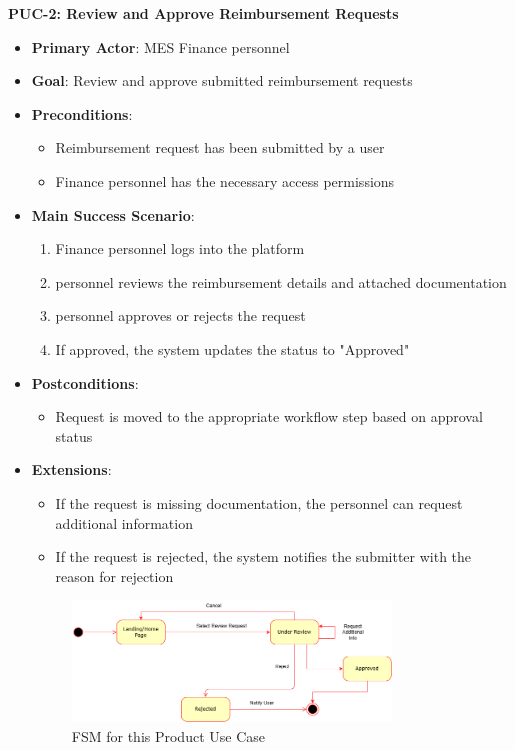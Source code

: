 \documentclass[12pt]{article}
\begin{document}
\textbf{PUC-2: Review and Approve Reimbursement Requests}
\begin{itemize}
    \item \textbf{Primary Actor}: MES Finance personnel
    \item \textbf{Goal}: Review and approve submitted reimbursement requests
    \item \textbf{Preconditions}:
    \begin{itemize}
        \item Reimbursement request has been submitted by a user
        \item Finance personnel has the necessary access permissions
    \end{itemize}
    \item \textbf{Main Success Scenario}:
    \begin{enumerate}
        \item Finance personnel logs into the platform
        \item personnel reviews the reimbursement details and attached documentation
        \item personnel approves or rejects the request
        \item If approved, the system updates the status to "Approved"
    \end{enumerate}
    \item \textbf{Postconditions}:
    \begin{itemize}
        \item Request is moved to the appropriate workflow step based on approval status
    \end{itemize}
    \item \textbf{Extensions}:
    \begin{itemize}
        \item If the request is missing documentation, the personnel can request additional information
        \item If the request is rejected, the system notifies the submitter with the reason for rejection
    \end{itemize}

    \begin{figure}[h!]
        \centering
        \includegraphics[width=0.8\textwidth]{./imgs/case diagram 4.png}
        \caption{FSM for this Product Use Case}
    \end{figure}
\end{itemize}
\end{document}

